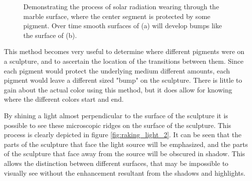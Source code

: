 \documentclass[10pt]{armath}
\begin{document}
\begin{figure}[htpb]
  \begin{center}
  \end{center}
  \caption{Demonstrating the process of solar radiation wearing through the
    marble surface, where the center segment is protected by some pigment. Over
  time smooth surfaces of (a) will develop bumps like the surface of (b).}
  \label{fig:raking_light_1}
\end{figure}

This method becomes very useful to determine where different pigments were on a
sculpture, and to ascertain the location of the transitions between them. Since
each pigment would protect the underlying medium different amounts, each
pigment would leave a different sized "bump" on the sculpture. There is little
to gain about the actual color using this method, but it does allow for knowing
where the different colors start and end.

By shining a light almost perpendicular to the surface of the sculpture it is
possible to see these microscopic ridges on the surface of the sculpture. This
process is clearly depicted in figure \ref{fig:raking_light_2}. It can be seen
that the parts of the sculpture that face the light source will be emphasized,
and the parts of the sculpture that face away from the source will be obscured
in shadow. This allows the distinction between different surfaces, that may be
impossible to visually see without the enhancement resultant from the shadows and
highlights.
\end{document}
